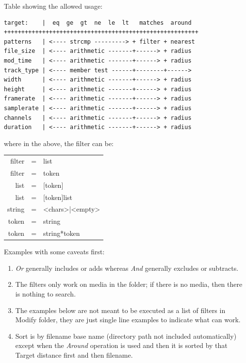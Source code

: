 Table showing the allowed usage:

\begin{lstlisting}[numbers=none]
target:    |  eq  ge  gt  ne  le  lt   matches  around
++++++++++++++++++++++++++++++++++++++++++++++++++++++++
patterns   | <---- strcmp ---------> + filter + nearest
file_size  | <---- arithmetic -------+------> + radius
mod_time   | <---- arithmetic -------+------> + radius
track_type | <---- member test ------+--------+------>
width      | <---- arithmetic -------+------> + radius
height     | <---- arithmetic -------+------> + radius
framerate  | <---- arithmetic -------+------> + radius
samplerate | <---- arithmetic -------+------> + radius
channels   | <---- arithmetic -------+------> + radius
duration   | <---- arithmetic -------+------> + radius
\end{lstlisting}

where in the above, the filter can be:

\begin{tabular}{rcl}
    filter&=&list\\
    filter&=&token\\
    list&=&[token]\\
    list&=&[token]list\\
    string&=&<chars>|<empty>\\
    token&=&string\\
    token&=&string*token\\
\end{tabular}

Examples with some caveats first:

\begin{enumerate}
    \item   \textit{Or} generally includes or adds whereas \textit{And} generally excludes or subtracts.
    \item   The filters only work on media in the folder; if there is no media, then there is nothing to search.
    \item   The examples below are not meant to be executed as a list of filters in Modify folder, they are just single line examples to indicate what can work.
    \item   Sort is by filename base name (directory path not included automatically) except when the \textit{Around} operation is used and then it is sorted by that Target distance first and then filename.
\end{enumerate}

